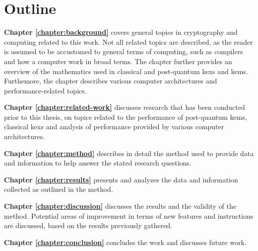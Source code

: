\section{Outline}
\label{section:introduction:outline}

\noindent\textbf{Chapter \ref{chapter:background}} covers general topics in cryptography and computing related to this work. Not all related topics are described, as the reader is assumed to be accustomed to general terms of computing, such as compilers and how a computer work in broad terms. The chapter further provides an overview of the mathematics used in classical and \gls{post-quantum} \glspl{kex} and \glspl{kem}. Furthemore, the chapter describes various computer architectures and performance-related topics.

\noindent\textbf{Chapter \ref{chapter:related-work}} discusses research that has been conducted prior to this thesis, on topics related to the performance of \gls{post-quantum} \glspl{kem}, classical \glspl{kex} and analysis of performance provided by various computer architectures.

\noindent\textbf{Chapter \ref{chapter:method}} describes in detail the method used to provide data and information to help answer the stated research questions.

\noindent\textbf{Chapter \ref{chapter:results}} presents and analyzes the data and information collected as outlined in the method.

\noindent\textbf{Chapter \ref{chapter:discussion}} discusses the results and the validity of the method. Potential areas of improvement in terms of new features and instructions are discussed, based on the results previously gathered.

\noindent\textbf{Chapter \ref{chapter:conclusion}} concludes the work and discusses future work.